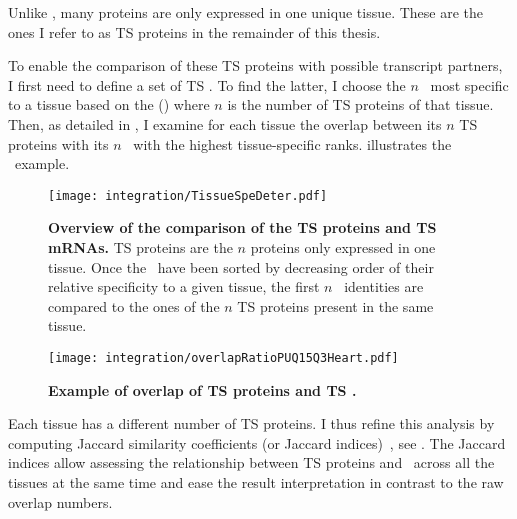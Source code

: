 Unlike \mRNAs,
many proteins are only expressed in one unique tissue.
These are the ones I refer to as \gls{TS} proteins in the remainder of this thesis.\mybr\

To enable the comparison of these \gls{TS} proteins with possible transcript partners,
I first need to define a set of \gls{TS} \mRNAs{}.
To find the latter, I choose the $n$ \mRNAs\ most specific to a tissue
based on the  ()
where $n$ is the number of \gls{TS} proteins of that tissue.
Then, as detailed in ,
I examine for each tissue the overlap between its $n$ \gls{TS} proteins
with its $n$ \mRNAs\ with the highest tissue-specific ranks.
 illustrates the \heart\ example.

\begin{figure}[!htb]
    \texttt{[image: integration/TissueSpeDeter.pdf]}\centering
    \vspace{-3mm}
    \caption[Determination process of the specific mRNAs]{%
    \label{fig:RankSpe}\textbf{Overview of the comparison of the TS proteins
    and TS mRNAs.}
    \gls{TS} proteins are the $n$ proteins only expressed in one tissue.
    Once the \mRNAs\ have been sorted
    by decreasing order of their relative specificity to a given tissue,
    the first $n$ \mRNAs\ identities are compared
    to the ones of the $n$ \gls{TS} proteins present in the same tissue.
    }
\end{figure}

\begin{figure}[!htbp]
\texttt{[image: integration/overlapRatioPUQ15Q3Heart.pdf]}\centering
\vspace{-3mm}
    \caption[Example of overlap of TS proteins and TS mRNAs for Heart]{%
    \label{fig:ExJacquard}\textbf{Example of overlap of \gls{TS} proteins
    and \gls{TS} \mRNAs.}}
\end{figure}

Each tissue has a different number of \gls{TS} proteins.
I thus refine this analysis
by computing Jaccard similarity coefficients
(or Jaccard indices)~,
see .
The Jaccard indices allow assessing
the relationship between \gls{TS} proteins and \mRNAs\
across all the tissues at the same time
and ease the result interpretation in contrast to the raw overlap numbers.

